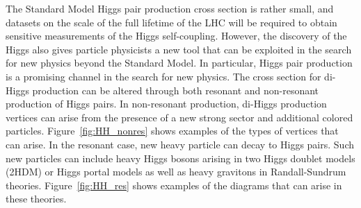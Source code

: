 The Standard Model Higgs pair production cross section is rather small, and datasets on the scale of the full lifetime of the LHC will be required to obtain sensitive measurements of the Higgs self-coupling. However, the discovery of the Higgs also gives particle physicists a new tool that can be exploited in the search for new physics beyond the Standard Model. In particular, Higgs pair production is a promising channel in the search for new physics. The cross section for di-Higgs production can be altered through both resonant and non-resonant production of Higgs pairs. In non-resonant production, di-Higgs production vertices can arise from the presence of a new strong sector and additional colored particles\cite{HH_NewPhys,AnomalousHHVertex,CompositeDiHiggs}. Figure~\ref{fig:HH_nonres} shows examples of the types of vertices that can arise. In the resonant case, new heavy particle can decay to Higgs pairs. Such new particles can include heavy Higgs bosons arising in two Higgs doublet models (2HDM) or Higgs portal models as well as heavy gravitons in Randall-Sundrum theories\cite{HH_NewPhys,RSG1,RSG_LHC,RSG_LHC2,HH_2HDM,2HDM2,HiggsPortal}. Figure~\ref{fig:HH_res} shows examples of the diagrams that can arise in these theories.









